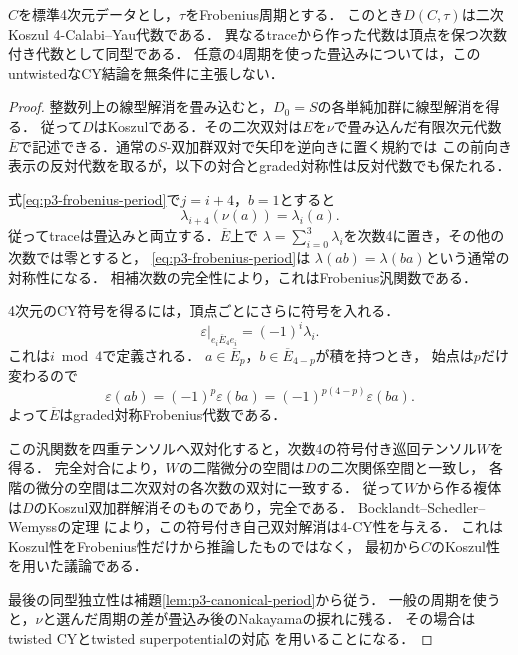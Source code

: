 \begin{theorem}
\label{thm:p3-canonical-cy-orbit}
$C$を標準4次元データとし，$\tau$をFrobenius周期とする．
このとき$D(C,\tau)$は二次Koszul 4-Calabi--Yau代数である．
異なるtraceから作った代数は頂点を保つ次数付き代数として同型である．
任意の4周期を使った畳込みについては，このuntwistedなCY結論を無条件に主張しない．
\end{theorem}
\begin{proof}
整数列上の線型解消を畳み込むと，$D_0=S$の各単純加群に線型解消を得る．
従って$D$はKoszulである．その二次双対は$E$を$\nu$で畳み込んだ有限次元代数
$\overline E$で記述できる．通常の$S$-双加群双対で矢印を逆向きに置く規約では
この前向き表示の反対代数を取るが，以下の対合とgraded対称性は反対代数でも保たれる．

式\eqref{eq:p3-frobenius-period}で$j=i+4$，$b=1$とすると
\[
 \lambda_{i+4}(\nu(a))=\lambda_i(a).
\]
従ってtraceは畳込みと両立する．$\overline E$上で
$\lambda=\sum_{i=0}^3\lambda_i$を次数4に置き，その他の次数では零とすると，
\eqref{eq:p3-frobenius-period}は
$\lambda(ab)=\lambda(ba)$という通常の対称性になる．
相補次数の完全性により，これはFrobenius汎関数である．

4次元のCY符号を得るには，頂点ごとにさらに符号を入れる．
\begin{equation}\label{eq:p3-graded-trace}
 \varepsilon|_{e_i\overline E_4e_i}=(-1)^i\lambda_i.
\end{equation}
これは$i\bmod4$で定義される．
$a\in\overline E_p$，$b\in\overline E_{4-p}$が積を持つとき，
始点は$p$だけ変わるので
\begin{equation}\label{eq:p3-graded-symmetry}
 \varepsilon(ab)=(-1)^p\varepsilon(ba)
                 =(-1)^{p(4-p)}\varepsilon(ba).
\end{equation}
よって$\overline E$はgraded対称Frobenius代数である．

この汎関数を四重テンソルへ双対化すると，次数4の符号付き巡回テンソル$W$を得る．
完全対合により，$W$の二階微分の空間は$D$の二次関係空間と一致し，
各階の微分の空間は二次双対の各次数の双対に一致する．
従って$W$から作る複体は$D$のKoszul双加群解消そのものであり，完全である．
Bocklandt--Schedler--Wemyssの定理
\cite[Theorem~6.2, Lemmas~6.4--6.5 and equation~(6.2)]{BSWPotentials}
により，この符号付き自己双対解消は4-CY性を与える．
これはKoszul性をFrobenius性だけから推論したものではなく，
最初から$C$のKoszul性を用いた議論である．

最後の同型独立性は補題\ref{lem:p3-canonical-period}から従う．
一般の周期を使うと，$\nu$と選んだ周期の差が畳込み後のNakayamaの捩れに残る．
その場合はtwisted CYとtwisted superpotentialの対応
\cite[Theorem~6.2の証明直後のtwisted版への拡張]{BSWPotentials}
を用いることになる．
\end{proof}

